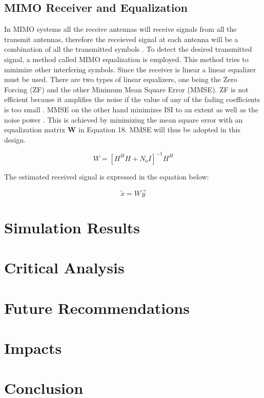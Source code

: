 \documentclass[pdftex,11pt,a4paper]{article}
\begin{document}
\subsection{MIMO Receiver and Equalization}
In MIMO systems all the receive antennas will receive signals from all the transmit antennas, therefore the receieved signal at each antenna will be a combination of all the transmitted symbols \cite{BOOK8}. To detect the desired transmitted signal, a method called MIMO equalization is employed. This method tries to minimize other interfering symbols. Since the receiver is linear a linear equalizer must be used. There are two types of linear equalizers, one being the Zero Forcing (ZF) and the other Minimum Mean Square Error (MMSE). ZF is not efficient because it amplifies the noise if the value of any of the fading coefficients is too small \cite{46}. MMSE on the other hand minimizes ISI to an extent as well as the noise power \cite{41}. This is achieved by minimizing the mean square error with an equalization matrix \textbf{W} in Equation 18. MMSE will thus be adopted in this design. 

\begin{equation}
	W = {[H^{H}H + N_o I]}^{-1} H^H
\end{equation}

The estimated received signal is expressed in the equation below:

\begin{equation}
	\tilde{x} = W\vec{y}
\end{equation}
\section{Simulation Results}
\section{Critical Analysis}

\section{Future Recommendations}
\section{Impacts}

\section{Conclusion}
\newpage


\end{document}
